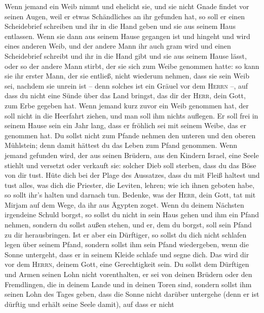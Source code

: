 Wenn jemand ein Weib nimmt und ehelicht sie, und sie
nicht Gnade findet vor seinen Augen, weil er etwas Schändliches an ihr
gefunden hat, so soll er einen Scheidebrief schreiben und ihr in die
Hand geben und sie aus seinem Haus entlassen.  Wenn sie
dann aus seinem Hause gegangen ist und hingeht und wird eines anderen
Weib,  und der andere Mann ihr auch gram wird und einen
Scheidebrief schreibt und ihr in die Hand gibt und sie aus seinem Hause
lässt, oder so der andere Mann stirbt, der sie sich zum Weibe genommen
hatte:  so kann sie ihr erster Mann, der sie entließ,
nicht wiederum nehmen, dass sie sein Weib sei, nachdem sie unrein ist --
denn solches ist ein Gräuel vor dem \textsc{Herrn} --, auf dass du nicht
eine Sünde über das Land bringst, das dir der \textsc{Herr}, dein Gott,
zum Erbe gegeben hat.  Wenn jemand kurz zuvor ein Weib
genommen hat, der soll nicht in die Heerfahrt ziehen, und man soll ihm
nichts auflegen. Er soll frei in seinem Hause sein ein Jahr lang, dass
er fröhlich sei mit seinem Weibe, das er genommen hat.  Du
sollst nicht zum Pfande nehmen den unteren und den oberen Mühlstein;
denn damit hättest du das Leben zum Pfand genommen.  Wenn
jemand gefunden wird, der aus seinen Brüdern, aus den Kindern Israel,
eine Seele stiehlt und versetzt oder verkauft sie: solcher Dieb soll
sterben, dass du das Böse von dir tust.  Hüte dich bei der
Plage des Aussatzes, dass du mit Fleiß haltest und tust alles, was dich
die Priester, die Leviten, lehren; wie ich ihnen geboten habe, so sollt
ihr's halten und darnach tun.  Bedenke, was der
\textsc{Herr}, dein Gott, tat mit Mirjam auf dem Wege, da ihr aus
Ägypten zoget.  Wenn du deinem Nächsten irgendeine Schuld
borgst, so sollst du nicht in sein Haus gehen und ihm ein Pfand nehmen,
 sondern du sollst außen stehen, und er, dem du borgst,
soll sein Pfand zu dir herausbringen.  Ist er aber ein
Dürftiger, so sollst du dich nicht schlafen legen über seinem Pfand,
 sondern sollst ihm sein Pfand wiedergeben, wenn die
Sonne untergeht, dass er in seinem Kleide schlafe und segne dich. Das
wird dir vor dem \textsc{Herrn}, deinem Gott, eine Gerechtigkeit sein.
 Du sollst dem Dürftigen und Armen seinen Lohn nicht
vorenthalten, er sei von deinen Brüdern oder den Fremdlingen, die in
deinem Lande und in deinen Toren sind,  sondern sollst
ihm seinen Lohn des Tages geben, dass die Sonne nicht darüber untergehe
(denn er ist dürftig und erhält seine Seele damit), auf dass er nicht
